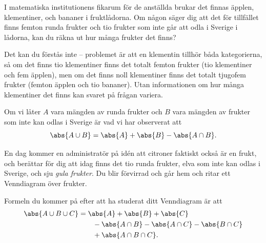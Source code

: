 \documentclass[nobib]{tufte-handout}
\begin{document}
I matematiska institutionens fikarum för de anställda brukar det finnas äpplen, klementiner, och bananer i fruktlådorna. Om någon säger dig att det för tillfället finns femton runda frukter och tio frukter som inte går att odla i Sverige i lådorna, kan du räkna ut hur många frukter det finns?

Det kan du förstås inte -- problemet är att en klementin tillhör båda kategorierna, så om det finns tio klementiner finns det totalt femton frukter (tio klementiner och fem äpplen), men om det finns noll klementiner finns det totalt tjugofem frukter (femton äpplen och tio bananer). Utan informationen om hur många klementiner det finns kan svaret på frågan variera.

Om vi låter $A$ vara mängden av runda frukter och $B$ vara mängden av frukter som inte kan odlas i Sverige är vad vi har observerat att
$$\abs{A \cup B} = \abs{A} + \abs{B} - \abs{A \cap B}.$$

En dag kommer en administratör på idén att citroner faktiskt också är en frukt, och berättar för dig att idag finns det tio runda frukter, elva som inte kan odlas i Sverige, och sju \emph{gula frukter}. Du blir förvirrad och går hem och ritar ett Venndiagram över frukter.

Formeln du kommer på efter att ha studerat ditt Venndiagram är att
\begin{align*}
  \abs{A \cup B \cup C} &= \abs{A} + \abs{B} + \abs{C}\\
  &\qquad - \abs{A \cap B} - \abs{A \cap C} - \abs{B \cap C}\\
  &\qquad + \abs{A \cap B \cap C}.
\end{align*}
\end{document}
